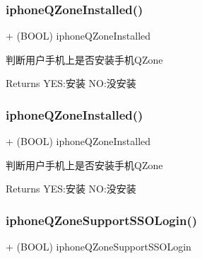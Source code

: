 \subsubsection{\texorpdfstring{iphone\+Q\+Zone\+Installed()}{iphoneQZoneInstalled()}\hspace{0.1cm}{\footnotesize\ttfamily [1/2]}}
{\footnotesize\ttfamily + (B\+O\+OL) iphone\+Q\+Zone\+Installed \begin{DoxyParamCaption}{ }\end{DoxyParamCaption}}

判断用户手机上是否安装手机\+Q\+Zone \begin{DoxyReturn}{Returns}
Y\+ES\+:安装 NO\+:没安装 
\end{DoxyReturn}
\mbox{\label{interface_tencent_o_auth_a197f6599acf18b3b36745f4d78614537}} 
\subsubsection{\texorpdfstring{iphone\+Q\+Zone\+Installed()}{iphoneQZoneInstalled()}\hspace{0.1cm}{\footnotesize\ttfamily [2/2]}}
{\footnotesize\ttfamily + (B\+O\+OL) iphone\+Q\+Zone\+Installed \begin{DoxyParamCaption}{ }\end{DoxyParamCaption}}

判断用户手机上是否安装手机\+Q\+Zone \begin{DoxyReturn}{Returns}
Y\+ES\+:安装 NO\+:没安装 
\end{DoxyReturn}
\mbox{\label{interface_tencent_o_auth_a981268c1a6133c1fb6cd378a98de0b5c}} 
\subsubsection{\texorpdfstring{iphone\+Q\+Zone\+Support\+S\+S\+O\+Login()}{iphoneQZoneSupportSSOLogin()}\hspace{0.1cm}{\footnotesize\ttfamily [1/2]}}
{\footnotesize\ttfamily + (B\+O\+OL) iphone\+Q\+Zone\+Support\+S\+S\+O\+Login \begin{DoxyParamCaption}{ }\end{DoxyParamCaption}}

